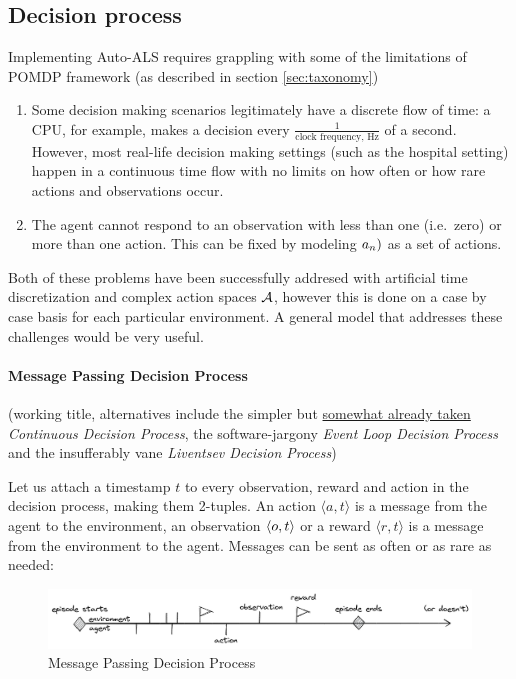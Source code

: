 \newpage
\subsection{Decision process}
\label{sec:mpdp}

Implementing Auto-ALS requires grappling with some of the limitations of POMDP framework (as described in section \ref{sec:taxonomy})
\begin{enumerate}
    \item Some decision making scenarios legitimately have a discrete flow of time: a CPU, for example, makes a decision every $\frac{1}{\text{clock frequency, Hz}}$ of a second. However, most real-life decision making settings (such as the hospital setting) happen in a continuous time flow with no limits on how often or how rare actions and observations occur.
    \item The agent cannot respond to an observation with less than one (i.e.~zero) or more than one action. This can be fixed by modeling $a_n)$ as a set of actions.
\end{enumerate}

Both of these problems have been successfully addresed with artificial time discretization and complex action spaces $\mathcal{A}$, however this is done on a case by case basis for each particular environment. A general model that addresses these challenges would be very useful.

\paragraph{Message Passing Decision Process}

(working title, alternatives include the simpler but
\href{https://homes.cs.washington.edu/~todorov/courses/amath579/reading/Continuous.pdf}{somewhat
already taken} \emph{Continuous Decision Process}, the software-jargony
\emph{Event Loop Decision Process} and the insufferably vane
\emph{Liventsev Decision Process})

Let us attach a timestamp $t$ to every observation, reward and action in the decision process, making them 2-tuples. An action $\langle a, t\rangle$ is a message from the agent to the environment, an observation $\langle o, t \rangle$ or a reward $\langle r, t \rangle$ is a message from the environment
to the agent. Messages can be sent as often or as rare as needed:

\begin{figure}
\centering
\includegraphics[width=\linewidth]{images/mpdp.png}
\caption{Message Passing Decision Process}
\end{figure}

